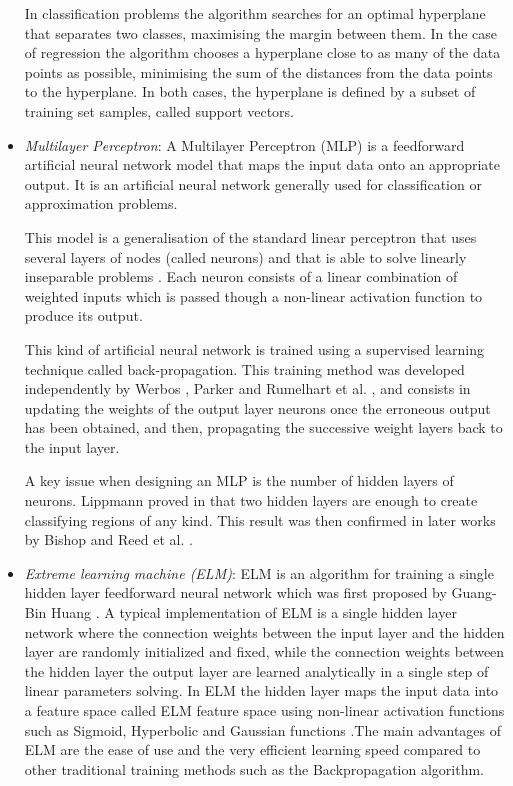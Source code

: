 \documentclass[a4paper,10pt,twocolumn,preprint,3p]{elsarticle}
\begin{document}
\begin{itemize}
In classification problems the algorithm searches for an optimal hyperplane 
that separates two classes, maximising the margin between them. 
In the case of regression the algorithm chooses a hyperplane close to as many 
of the data points as possible, minimising the sum of the distances from 
the data points to the hyperplane. 
In both cases, the hyperplane is defined by a subset of training set samples, 
called support vectors.



 \item \emph{Multilayer Perceptron}:
A Multilayer Perceptron (MLP) \cite{Rosenblatt1962,Widrow1990} is a feedforward 
artificial neural network model that maps the input data onto an appropriate output. 
It is an artificial neural network generally used for classification or 
approximation problems.

This model is a generalisation of the standard linear perceptron that uses several 
layers of nodes (called neurons) and that is able to solve linearly inseparable 
problems \cite{SteinwenderBitzer2003}.
Each neuron consists of a linear combination of weighted inputs which is passed 
though a non-linear activation function to produce its output.

This kind of artificial neural network is trained using a supervised learning 
technique called back-propagation.
This training method was developed independently by Werbos \cite{Werbos1974}, 
Parker \cite{Parker1985} and Rumelhart et al. \cite{Rumelhart1985}, and consists
in updating the weights of the output layer neurons once the erroneous output 
has been obtained, and then, propagating the successive weight layers back to 
the input layer.

A key issue when designing an MLP is the number of hidden layers of neurons.
Lippmann proved in \cite{Lippmann1987} that two hidden layers are enough to 
create classifying regions of any kind. This result was then confirmed in later 
works by Bishop \cite{Bishop1996} and Reed et al. \cite{Reed1999}.

\item \emph{Extreme learning machine (ELM)}: 
ELM is an algorithm for training a single hidden 
layer feedforward neural network which was first proposed by Guang-Bin Huang \cite
{huang2006extreme}. A typical implementation of ELM is a single hidden layer network where the 
connection weights between the input layer and the hidden layer are randomly initialized and 
fixed, while the connection weights between the hidden layer the output layer are learned 
analytically in a single step of linear parameters solving. In ELM the hidden layer maps the 
input data into a feature space called ELM feature space using non-linear activation functions 
such as Sigmoid, Hyperbolic and Gaussian functions \cite{huang2015trends}.The main advantages 
of ELM are the ease of use and the very efficient learning speed compared to other traditional 
training methods such as the Backpropagation algorithm. 


\end{itemize}
\end{document}
